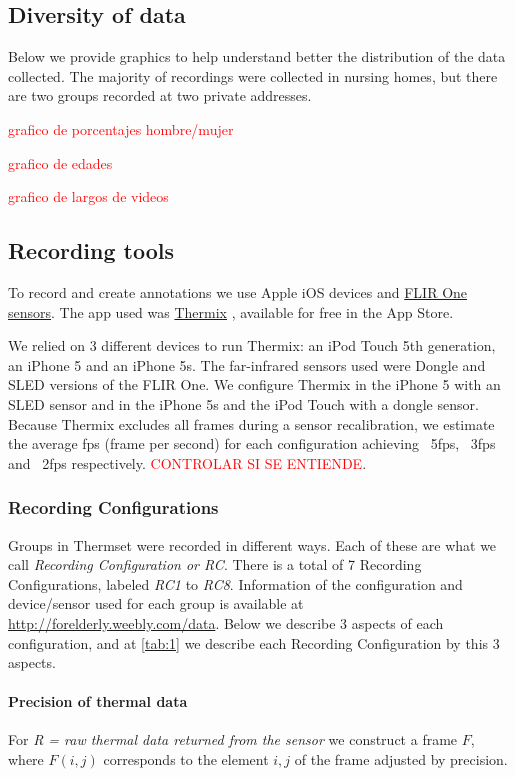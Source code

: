\documentclass[oneside, twocolumn]{article}
\newcommand\myworries[1]{\textcolor{red}{#1}}
\begin{document}
\subsection{Diversity of data}
Below we provide graphics to help understand better the distribution of the data collected. The majority of recordings were collected in nursing homes, but there are two groups recorded at two private addresses.

\myworries{grafico de porcentajes hombre/mujer}

\myworries{grafico de edades}

\myworries{grafico de largos de videos}

\subsection{Recording tools}
To record and create annotations we use Apple iOS devices and \href{http://www.flir.com/flirone/ios/}{FLIR One sensors}. The app used was \href{http://appstore.com/thermixforflirone}{Thermix}\cite{thermix} , available for free in the App Store.

We relied on 3 different devices to run Thermix: an iPod Touch 5th generation,
an iPhone 5 and an iPhone 5s. The far-infrared sensors used were Dongle and SLED versions of the FLIR One.
We configure Thermix in the iPhone 5 with an SLED sensor and in the iPhone 5s and the
iPod Touch with a dongle sensor\cite{sdk_flir_dongle}\cite{sdk_flir_sled}. Because Thermix excludes all frames during a sensor recalibration, we estimate the
average fps (frame per second) for each configuration achieving ~5fps, ~3fps and ~2fps respectively.
\myworries{CONTROLAR SI SE ENTIENDE}.

\subsubsection{Recording Configurations}
Groups in Thermset were recorded in different ways. Each of these are what we call \textit{Recording Configuration or RC}. There is a total of 7 Recording Configurations, labeled \textit{RC1} to \textit{RC8}. Information of the configuration and device/sensor used for each group is available at \url{http://forelderly.weebly.com/data}.  Below we describe 3 aspects of each configuration, and at \autoref{tab:1} we describe each Recording Configuration by this 3 aspects.

\paragraph{Precision of thermal data}
	For \textit{R = raw thermal data returned from the sensor} we construct a frame $F$, where $F(i,j)$ corresponds to the element $i,j$ of the frame adjusted by precision.
\end{document}
